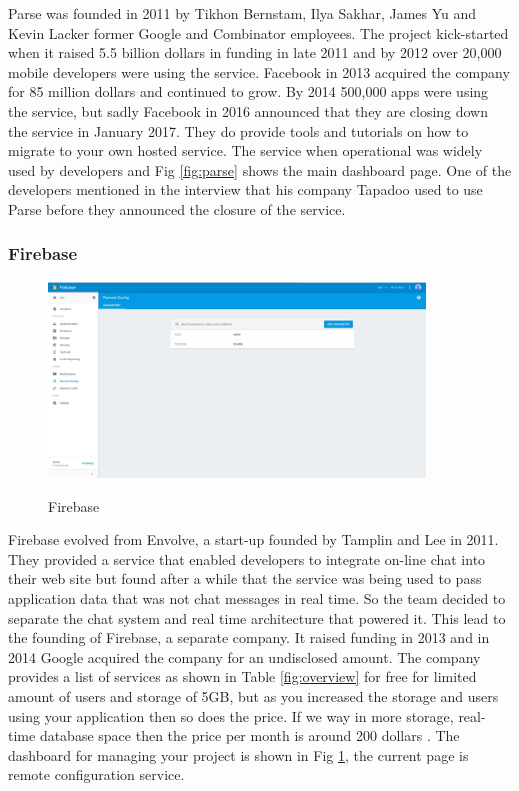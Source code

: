 Parse \cite{parse} was founded in 2011 by Tikhon Bernstam, Ilya Sakhar, James Yu and Kevin Lacker former Google and Combinator employees. The project kick-started when it raised 5.5 billion dollars in funding in late 2011 and by 2012 over 20,000 mobile developers were using the service. Facebook in 2013 acquired the company for 85 million dollars and continued to grow. By 2014 500,000 apps were using the service, but sadly Facebook in 2016 announced that they are closing down the service in January 2017. They do provide tools and tutorials on how to migrate to your own hosted service. The service when operational was widely used by developers and Fig \ref{fig:parse} shows the main dashboard page. One of the developers mentioned in the interview that his company Tapadoo used to use Parse before they announced the closure of the service.

\subsubsection{Firebase}

\begin{figure}[!h]
    \caption{Firebase}
    \centering
    \includegraphics[width=100mm]{images/firebase}
    \label{fig:firebase}
\end{figure}

Firebase \cite{firebase}  evolved from Envolve, a start-up founded by Tamplin and Lee in 2011. They provided a service that enabled developers to integrate on-line chat into their web site but found after a while that the service was being used to pass application data that was not chat messages in real time. So the team decided to separate the chat system and real time architecture that powered it. This lead to the founding of Firebase, a separate company. 
It raised funding in 2013 and in 2014 Google acquired the company for an undisclosed amount. The company provides a list of services as shown in Table \ref{fig:overview} for free for limited amount of users and storage of 5GB, but as you increased the storage and users using your application then so does the price. If we way in more storage, real-time database space then the price per month is around 200 dollars \cite{firebase2}. The dashboard for managing your project is shown in Fig \ref{fig:firebase}, the current page is remote configuration service.

